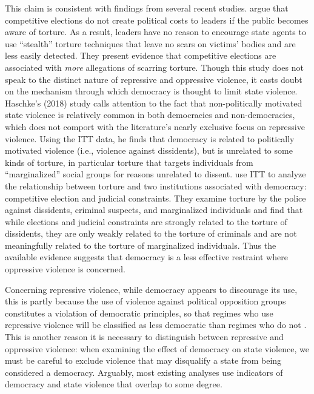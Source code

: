 \documentclass[11pt]{article}
\begin{document}
This claim is consistent with findings from several recent studies. \citet{ConradHillMoore2018} argue that competitive elections do not create political costs to leaders if the public becomes aware of torture. As a result, leaders have no reason to encourage state agents to use ``stealth'' torture techniques that leave no scars on victims' bodies and are less easily detected. They present evidence that competitive elections are associated with {\em more} allegations of scarring torture. Though this study does not speak to the distinct nature of repressive and oppressive violence, it casts doubt on the mechanism through which democracy is thought to limit state violence. Haschke's (2018) study calls attention to the fact that non-politically motivated state violence is relatively common in both democracies and non-democracies, which does not comport with the literature's nearly exclusive focus on repressive violence. Using the ITT data, he finds that democracy is related to politically motivated violence (i.e., violence against dissidents), but is unrelated to some kinds of torture, in particular torture that targets individuals from ``marginalized'' social groups for reasons unrelated to dissent. \citet{JacksonHillHall2018} use ITT to analyze the relationship between torture and two  institutions associated with democracy: competitive election and judicial constraints. They examine torture by the police against dissidents, criminal suspects, and marginalized individuals and find that while elections and judicial constraints are strongly related to the torture of dissidents, they are only weakly related to the torture of criminals and are not meaningfully related to the torture of marginalized individuals. Thus the available evidence suggests that democracy is a less effective restraint where oppressive violence is concerned.       

Concerning repressive violence, while democracy appears to discourage its use, this is partly because the use of violence against political opposition groups constitutes a violation of democratic principles, so that regimes who use repressive violence will be classified as less democratic than regimes who do not \citep{Hill2016}. This is another reason it is necessary to distinguish between repressive and oppressive violence: when examining the effect of democracy on state violence, we must be careful to exclude violence that may disqualify a state from being considered a democracy. Arguably, most existing analyses use indicators of democracy and state violence that overlap to some degree. 
\end{document}
